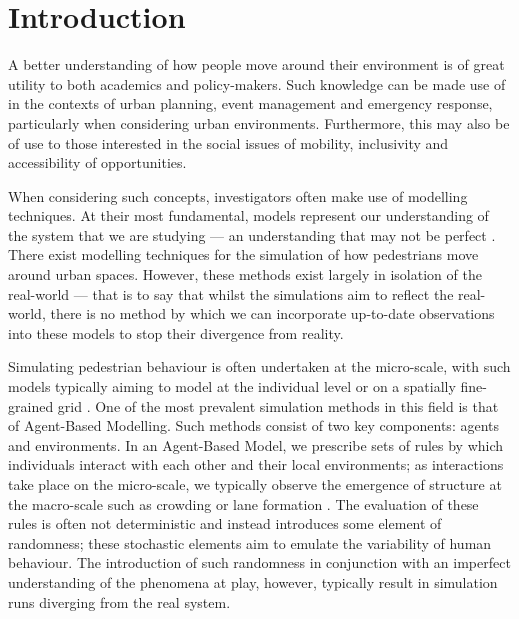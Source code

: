 \section{Introduction}\label{sec:intro}


A better understanding of how people move around their environment is of great
utility to both academics and policy-makers.
Such knowledge can be made use of in the contexts of urban planning, event
management and emergency response, particularly when considering urban
environments.
Furthermore, this may also be of use to those interested in the social issues of
mobility, inclusivity and accessibility of opportunities.

When considering such concepts, investigators often make use of modelling
techniques.
At their most fundamental, models represent our understanding of
the system that we are studying --- an understanding that may not be perfect
\citep{stanislaw1986tests}.
There exist modelling techniques for the simulation of how pedestrians move
around urban spaces.
However, these methods exist largely in isolation of the real-world --- that is
to say that whilst the simulations aim to reflect the real-world, there is no
method by which we can incorporate up-to-date observations into these models to
stop their divergence from reality.

Simulating pedestrian behaviour is often undertaken at the micro-scale, with
such models typically aiming to model at the individual level or on a spatially
fine-grained grid \citep{burstedde2001simulation}.
One of the most prevalent simulation methods in this field is that of
Agent-Based Modelling.
Such methods consist of two key components: agents and environments.
In an Agent-Based Model, we prescribe sets of rules by which individuals interact with each
other and their local environments; as interactions take place on the
micro-scale, we typically observe the emergence of structure at the macro-scale
such as crowding \citep{batty2003discrete} or lane formation \citep{liu2014agent}.
The evaluation of these rules is often not deterministic and instead
introduces some element of randomness; these stochastic elements aim to emulate
the variability of human behaviour.
The introduction of such randomness in conjunction with an imperfect
understanding of the phenomena at play, however, typically result in simulation
runs diverging from the real system.

